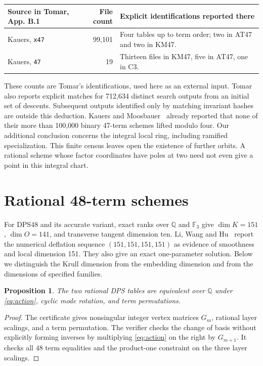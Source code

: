 \documentclass[11pt,reqno]{amsart}
\newcommand{\F}{\mathbb F}
\newcommand{\Q}{\mathbb Q}
\newtheorem{proposition}[theorem]{Proposition}
\begin{document}
\begin{center}
\small
\begin{tabularx}{\textwidth}{@{}l r X@{}}
\toprule
Source in Tomar, App. B.1 & File count & Explicit identifications reported there\\
\midrule
Kauers, \texttt{x47} & 99,101 & Four tables up to term order; two in AT47 and two in KM47.\\
Kauers, \texttt{47}  & 19 & Thirteen files in KM47, five in AT47, one in C3.\\
\bottomrule
\end{tabularx}
\end{center}
These counts are Tomar's identifications, used here as an external input. Tomar also reports explicit matches for 712,634 distinct search outputs from an initial set of descents. Subsequent outputs identified only by matching invariant hashes are outside this deduction. Kauers and Moosbauer~\cite{km} already reported that none of their more than 100,000 binary 47-term schemes lifted modulo four. Our additional conclusion concerns the integral local ring, including ramified specialization. This finite census leaves open the existence of further orbits. A rational scheme whose factor coordinates have poles at two need not even give a point in this integral chart.

\section{Rational 48-term schemes}
For DPS48 and its accurate variant, exact ranks over \(\Q\) and \(\F_3\) give \(\dim K=151\), \(\dim O=141\), and transverse tangent dimension ten. Li, Wang and Hu~\cite[\S5.2.1, v2]{lwh} report the numerical deflation sequence \((151,151,151,151)\) as evidence of smoothness and local dimension 151. They also give an exact one-parameter solution. Below we distinguish the Krull dimension from the embedding dimension and from the dimensions of specified families.

\begin{proposition}\label{prop:accurate}
The two rational DPS tables are equivalent over \(\Q\) under \eqref{eq:action}, cyclic mode rotation, and term permutations.
\end{proposition}
\begin{proof}
The certificate gives nonsingular integer vertex matrices \(G_m\), rational layer scalings, and a term permutation. The verifier checks the change of basis without explicitly forming inverses by multiplying \eqref{eq:action} on the right by \(G_{m+1}\). It checks all \(48\) term equalities and the product-one constraint on the three layer scalings.
\end{proof}
\end{document}
